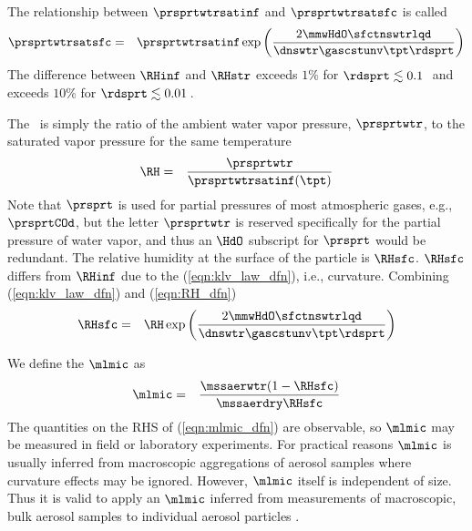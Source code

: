 \documentclass[12pt,twoside]{book}
\begin{document}
The relationship between $\prsprtwtrsatinf$ and $\prsprtwtrsatsfc$
is called 
\begin{eqnarray}
\prsprtwtrsatsfc & = & \prsprtwtrsatinf \exp \left( \frac{2 \mmwHdO
\sfctnswtrlqd}{\dnswtr \gascstunv \tpt \rdsprt } \right)
\label{eqn:klv_law_dfn}
\end{eqnarray}
The difference between $\RHinf$ and $\RHstr$ exceeds $1\%$ for 
$\rdsprt \lesssim 0.1$\,\um\ and exceeds $10\%$ for $\rdsprt \lesssim
0.01$\,\um. %

The  \RH\ is simply the ratio of the ambient
water vapor pressure, $\prsprtwtr$, to the saturated vapor pressure
for the same temperature 
\begin{eqnarray}
\RH & = & \frac{\prsprtwtr}{\prsprtwtrsatinf(\tpt)} 
\label{eqn:RH_dfn}
\end{eqnarray}
Note that $\prsprt$ is used for partial pressures of most atmospheric
gases, e.g., $\prsprtCOd$, but the letter $\prsprtwtr$ is reserved
specifically for the partial pressure of water vapor, and thus an
$\HdO$ subscript for $\prsprt$ would be redundant.
The relative humidity at the surface of the particle is $\RHsfc$.
$\RHsfc$ differs from $\RHinf$ due to the 
(\ref{eqn:klv_law_dfn}), i.e., curvature.
Combining (\ref{eqn:klv_law_dfn}) and (\ref{eqn:RH_dfn}) 
\begin{eqnarray}
\RHsfc & = & \RH \exp \left( \frac{2 \mmwHdO \sfctnswtrlqd}{\dnswtr
\gascstunv \tpt \rdsprt } \right)
\label{eqn:RH_str_dfn}
\end{eqnarray}

We define the  $\mlmic$ as
\begin{eqnarray}
\mlmic & = & \frac{\mssaerwtr ( 1 - \RHsfc )}{\mssaerdry \RHsfc}
\label{eqn:mlmic_dfn}
\end{eqnarray}
The quantities on the RHS of (\ref{eqn:mlmic_dfn}) are observable, so
$\mlmic$ may be measured in field or laboratory experiments. 
For practical reasons $\mlmic$ is usually inferred from macroscopic
aggregations of aerosol samples where curvature effects may be
ignored.
However, $\mlmic$ itself is independent of size. 
Thus it is valid to apply an $\mlmic$ inferred from measurements of
macroscopic, bulk aerosol samples to individual aerosol particles
\cite[]{Han76}.
\end{document}
